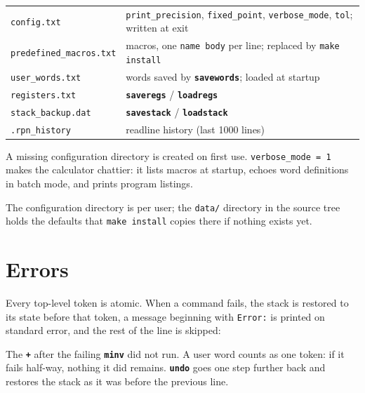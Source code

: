 \documentclass[11pt,letterpaper]{article}
\newcommand{\code}[1]{\texttt{#1}}
\newcommand{\cmd}[1]{\texttt{\textbf{#1}}}
\begin{document}
\begin{center}
\begin{tabular}{@{}lp{}@{}}
\toprule
\code{config.txt} & \code{print\_precision}, \code{fixed\_point}, \code{verbose\_mode}, \code{tol}; written at exit \\
\code{predefined\_macros.txt} & macros, one \code{name body} per line; replaced by \code{make install} \\
\code{user\_words.txt} & words saved by \cmd{savewords}; loaded at startup \\
\code{registers.txt} & \cmd{saveregs} / \cmd{loadregs} \\
\code{stack\_backup.dat} & \cmd{savestack} / \cmd{loadstack} \\
\code{.rpn\_history} & readline history (last 1000 lines) \\
\bottomrule
\end{tabular}
\end{center}
A missing configuration directory is created on first use. \code{verbose\_mode = 1} makes the calculator chattier: it lists macros at startup, echoes word definitions in batch mode, and prints program listings.

The configuration directory is per user; the \code{data/} directory in the source tree holds the defaults that \code{make install} copies there if nothing exists yet.

\section{Errors}

Every top-level token is atomic. When a command fails, the stack is restored to its state before that token, a message beginning with \code{Error:} is printed on standard error, and the rest of the line is skipped:
The \cmd{+} after the failing \cmd{minv} did not run. A user word counts as one token: if it fails half-way, nothing it did remains. \cmd{undo} goes one step further back and restores the stack as it was before the previous line.
\end{document}
